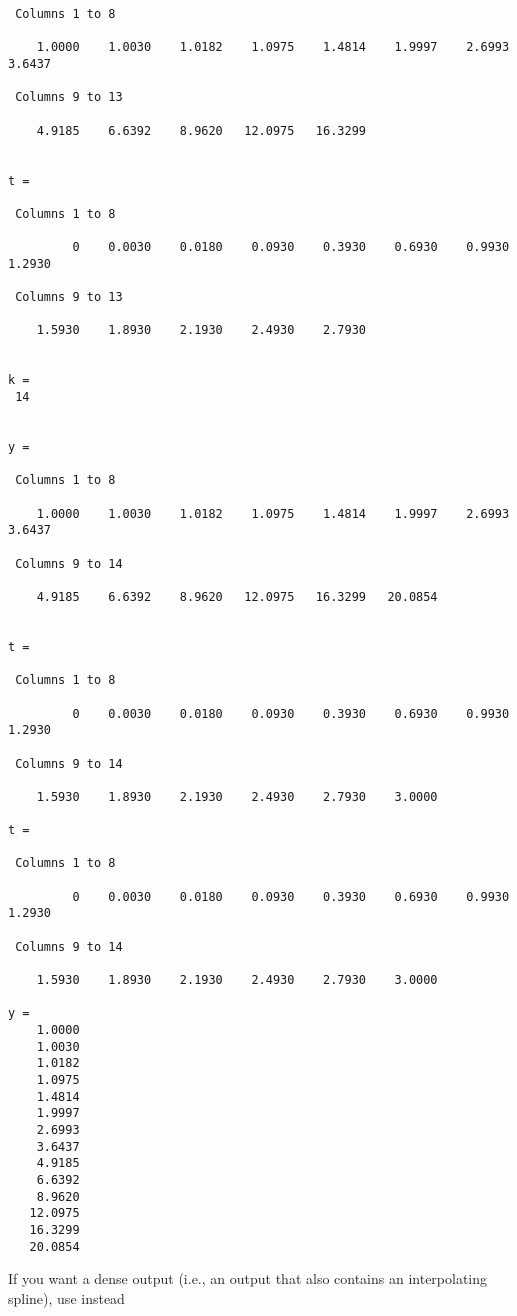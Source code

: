 \begin{verbatim}
 Columns 1 to 8

    1.0000    1.0030    1.0182    1.0975    1.4814    1.9997    2.6993    3.6437 

 Columns 9 to 13

    4.9185    6.6392    8.9620   12.0975   16.3299 


t = 

 Columns 1 to 8

         0    0.0030    0.0180    0.0930    0.3930    0.6930    0.9930    1.2930 

 Columns 9 to 13

    1.5930    1.8930    2.1930    2.4930    2.7930 


k = 
 14 


y = 

 Columns 1 to 8

    1.0000    1.0030    1.0182    1.0975    1.4814    1.9997    2.6993    3.6437 

 Columns 9 to 14

    4.9185    6.6392    8.9620   12.0975   16.3299   20.0854 


t = 

 Columns 1 to 8

         0    0.0030    0.0180    0.0930    0.3930    0.6930    0.9930    1.2930 

 Columns 9 to 14

    1.5930    1.8930    2.1930    2.4930    2.7930    3.0000 

t = 

 Columns 1 to 8

         0    0.0030    0.0180    0.0930    0.3930    0.6930    0.9930    1.2930 

 Columns 9 to 14

    1.5930    1.8930    2.1930    2.4930    2.7930    3.0000 

y = 
    1.0000 
    1.0030 
    1.0182 
    1.0975 
    1.4814 
    1.9997 
    2.6993 
    3.6437 
    4.9185 
    6.6392 
    8.9620 
   12.0975 
   16.3299 
   20.0854 
\end{verbatim}
 If you want a dense output (i.e., an output that also contains an interpolating
 spline), use instead
